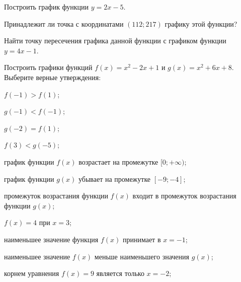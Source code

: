 %
%
%
%
\begin{class}[number=1]
	\begin{listofex}
		\item Построить график функции \( y=2x-5 \).
		\begin{enumcols}[itemcolumns=1]
			\item Принадлежит ли точка с координатами \( (112;217) \) графику этой функции?
			\item Найти точку пересечения графика данной функции с графиком функции \( y=4x-1 \).
		\end{enumcols}
		\item Построить графики функций \( f(x)=x^2-2x+1 \) и \( g(x)=x^2+6x+8 \).\\
		Выберите верные утверждения:
		\begin{enumcols}[itemcolumns=4]
			\item \( f(-1)>f(1) \);
			\item \( g(-1)<f(-1) \);
			\item \( g(-2)=f(1) \);
			\item \( f(3)<g(-5) \);
		\end{enumcols}
		\begin{enumcols}[itemcolumns=1, resume]
			\item график функции \( f(x) \) возрастает на промежутке \( [0;+\infty) \);
			\item график функции \( g(x) \) убывает на промежутке \( [-9;-4] \);
			\item промежуток возрастания функции \( f(x) \) входит в промежуток возрастания функции \( g(x) \);
			\item \( f(x)=4 \) при \( x=3 \);
			\item наименьшее значение функция \( f(x) \) принимает в \( x=-1 \);
			\item наименьшее значение \( f(x) \) меньше наименьшего значения \( g(x) \);
			\item корнем уравнения \( f(x)=9 \) является только \( x=-2 \);

\end{enumcols}
\end{listofex}
\end{class}
